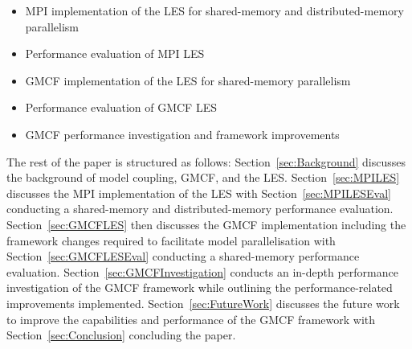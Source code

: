 \begin{itemize}

    \item MPI implementation of the LES for shared-memory and distributed-memory
    parallelism

    \item Performance evaluation of MPI LES

    \item GMCF implementation of the LES for shared-memory parallelism

    \item Performance evaluation of GMCF LES

    \item GMCF performance investigation and framework improvements

\end{itemize}

The rest of the paper is structured as follows: Section~\ref{sec:Background}
discusses the background of model coupling, GMCF, and the LES.
Section~\ref{sec:MPILES} discusses the MPI implementation of the LES with
Section~\ref{sec:MPILESEval} conducting a shared-memory and distributed-memory
performance evaluation. Section~\ref{sec:GMCFLES} then discusses the GMCF
implementation including the framework changes required to facilitate model
parallelisation with Section~\ref{sec:GMCFLESEval} conducting a shared-memory
performance evaluation. Section~\ref{sec:GMCFInvestigation} conducts an in-depth
performance investigation of the GMCF framework while outlining the
performance-related improvements implemented. Section~\ref{sec:FutureWork}
discusses the future work to improve the capabilities and performance of the
GMCF framework with Section~\ref{sec:Conclusion} concluding the paper.
